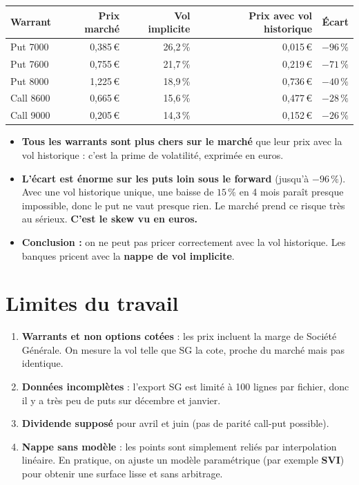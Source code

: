 \documentclass[11pt,a4paper]{article}
\begin{document}
\begin{center}
\begin{tabular}{lrrrr}
\toprule
Warrant & Prix marché & Vol implicite & Prix avec vol historique & Écart \\
\midrule
Put 7000  & 0,385\,€ & 26,2\,\% & 0,015\,€ & $-96\,\%$ \\
Put 7600  & 0,755\,€ & 21,7\,\% & 0,219\,€ & $-71\,\%$ \\
Put 8000  & 1,225\,€ & 18,9\,\% & 0,736\,€ & $-40\,\%$ \\
Call 8600 & 0,665\,€ & 15,6\,\% & 0,477\,€ & $-28\,\%$ \\
Call 9000 & 0,205\,€ & 14,3\,\% & 0,152\,€ & $-26\,\%$ \\
\bottomrule
\end{tabular}
\end{center}

\begin{aretenir}
\begin{itemize}[leftmargin=*]
  \item \textbf{Tous les warrants sont plus chers sur le marché} que leur prix avec la vol historique :
        c'est la prime de volatilité, exprimée en euros.
  \item \textbf{L'écart est énorme sur les puts loin sous le forward} (jusqu'à $-96\,\%$). Avec une vol
        historique unique, une baisse de $15\,\%$ en 4 mois paraît presque impossible, donc le put ne vaut
        presque rien. Le marché prend ce risque très au sérieux. \textbf{C'est le skew vu en euros.}
  \item \textbf{Conclusion :} on ne peut pas pricer correctement avec la vol historique. Les banques
        pricent avec la \textbf{nappe de vol implicite}.
\end{itemize}
\end{aretenir}

\section{Limites du travail}

\begin{enumerate}[leftmargin=*]
  \item \textbf{Warrants et non options cotées} : les prix incluent la marge de Société Générale.
        On mesure la vol telle que SG la cote, proche du marché mais pas identique.
  \item \textbf{Données incomplètes} : l'export SG est limité à 100 lignes par fichier, donc il y a
        très peu de puts sur décembre et janvier.
  \item \textbf{Dividende supposé} pour avril et juin (pas de parité call-put possible).
  \item \textbf{Nappe sans modèle} : les points sont simplement reliés par interpolation linéaire.
        En pratique, on ajuste un modèle paramétrique (par exemple \textbf{SVI}) pour obtenir une
        surface lisse et sans arbitrage.
\end{enumerate}
\end{document}
